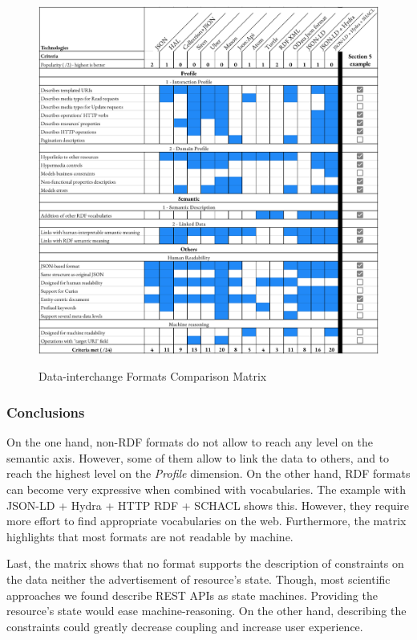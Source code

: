 \begin{figure}[Ht]
\caption{Data-interchange Formats Comparison Matrix}
\includegraphics[width=1\textwidth]{figures/DIF.png}
\label{interchange-formats-matrix}
\end{figure}

\subsubsection*{Conclusions}

On the one hand, non-RDF formats do not allow to reach any level on the semantic axis. However, some of them allow to link the data to others, and to reach the highest level on the \textit{Profile} dimension.
On the other hand, RDF formats can become very expressive when combined with vocabularies. The example with JSON-LD + Hydra + HTTP RDF + SCHACL shows this. However, they require more effort to find appropriate vocabularies on the web.
Furthermore, the matrix highlights that most formats are not readable by machine.

Last, the matrix shows that no format supports the description of constraints on the data neither the advertisement of resource's state. Though, most scientific approaches we found describe REST APIs as state machines. Providing the resource's state would ease machine-reasoning. On the other hand, describing the constraints could greatly decrease coupling and increase user experience. %

